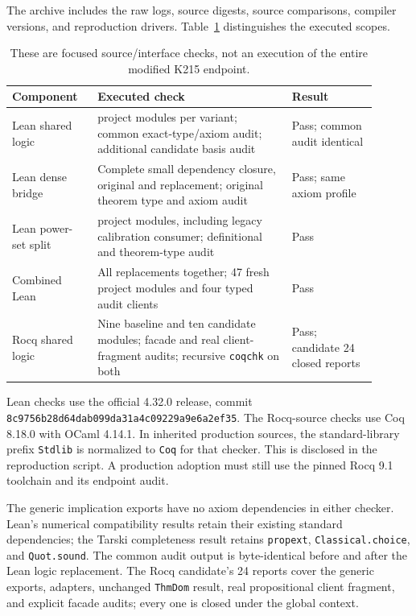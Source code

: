 \documentclass[11pt]{article}
\begin{document}
The archive includes the raw logs, source digests, source comparisons, compiler versions, and reproduction drivers. Table~\ref{tab:checks} distinguishes the executed scopes.

\begin{table}[ht]
\centering\small
\begin{tabular}{>{\raggedright\arraybackslash}p{0.21\linewidth}>{\raggedright\arraybackslash}p{0.48\linewidth}>{\raggedright\arraybackslash}p{0.21\linewidth}}
\toprule
Component & Executed check & Result\\
\midrule
Lean shared logic & 16 project modules per variant; common exact-type/axiom audit; additional candidate basis audit & Pass; common audit identical\\[3pt]
Lean dense bridge & Complete small dependency closure, original and replacement; original theorem type and axiom audit & Pass; same axiom profile\\[3pt]
Lean power-set split & 29 project modules, including legacy calibration consumer; definitional and theorem-type audit & Pass\\[3pt]
Combined Lean & All replacements together; 47 fresh project modules and four typed audit clients & Pass\\[3pt]
Rocq shared logic & Nine baseline and ten candidate modules; facade and real client-fragment audits; recursive \texttt{coqchk} on both & Pass; candidate 24 closed reports\\
\bottomrule
\end{tabular}
\caption{These are focused source/interface checks, not an execution of the entire modified K215 endpoint.}
\label{tab:checks}
\end{table}

Lean checks use the official 4.32.0 release, commit
\texttt{8c9756b28d64dab099da31a4c09229a9e6a2ef35}.
The Rocq-source checks use Coq 8.18.0 with OCaml 4.14.1. In inherited production sources, the standard-library prefix \texttt{Stdlib} is normalized to \texttt{Coq} for that checker. This is disclosed in the reproduction script. A production adoption must still use the pinned Rocq 9.1 toolchain and its endpoint audit.

The generic implication exports have no axiom dependencies in either checker. Lean's numerical compatibility results retain their existing standard dependencies; the Tarski completeness result retains \texttt{propext}, \texttt{Classical.choice}, and \texttt{Quot.sound}. The common audit output is byte-identical before and after the Lean logic replacement. The Rocq candidate's 24 reports cover the generic exports, adapters, unchanged \texttt{ThmDom} result, real propositional client fragment, and explicit facade audits; every one is closed under the global context.
\end{document}
